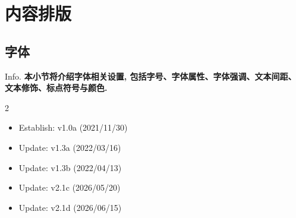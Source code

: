 \section{内容排版}
\subsection{字体}
\begin{frame}{Info.}
	\textbf{本小节将介绍字体相关设置, 包括字号、字体属性、字体强调、文本间距、文本修饰、标点符号与颜色.}
	\begin{multicols}{2}
		\begin{itemize}
			\item Establish: \textcolor{scugreen}{v1.0a (2021/11/30)}
			\item Update: \textcolor{scugreen}{v1.3a (2022/03/16)}
      \item Update: \textcolor{scugreen}{v1.3b (2022/04/13)}
      \item Update: \textcolor{scugreen}{v2.1c (2026/05/20)}
      \item Update: \textcolor{scugreen}{v2.1d (2026/06/15)}
		\end{itemize}
	\end{multicols}
	\mycopyright
\end{frame}

